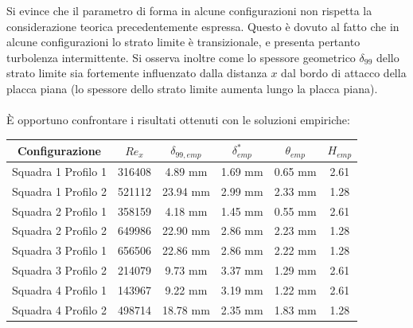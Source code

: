 \noindent Si evince che il parametro di forma in alcune configurazioni non rispetta la considerazione teorica precedentemente espressa. Questo è dovuto al fatto che in alcune configurazioni lo strato limite è transizionale, e presenta pertanto turbolenza intermittente. Si osserva inoltre come lo spessore geometrico $\delta_{99}$ dello strato limite sia fortemente influenzato dalla distanza $x$ dal bordo di attacco della placca piana (lo spessore dello strato limite aumenta lungo la placca piana).\\\\
\noindent È opportuno confrontare i risultati ottenuti con le soluzioni empiriche:
\begin{table}[H]
    \centering
    \begin{tabular}{|c|c|c|c|c|c|}
    \hline
    Configurazione             & $Re_x$ & $\delta_{99,emp}$ & $\delta^*_{emp}$ & $\theta_{emp}$ & $H_{emp}$ \\ \hline
    Squadra 1 Profilo 1 & 316408 & 4.89 mm           & 1.69 mm          & 0.65 mm        & 2.61      \\ \hline
    Squadra 1 Profilo 2 & 521112 & 23.94 mm          & 2.99 mm          & 2.33 mm        & 1.28      \\ \hline
    Squadra 2 Profilo 1 & 358159 & 4.18 mm           & 1.45 mm          & 0.55 mm        & 2.61      \\ \hline
    Squadra 2 Profilo 2 & 649986 & 22.90 mm          & 2.86 mm          & 2.23 mm        & 1.28      \\ \hline
    Squadra 3 Profilo 1 & 656506 & 22.86 mm          & 2.86 mm          & 2.22 mm        & 1.28      \\ \hline
    Squadra 3 Profilo 2 & 214079 & 9.73 mm           & 3.37 mm          & 1.29 mm        & 2.61      \\ \hline
    Squadra 4 Profilo 1 & 143967 & 9.22 mm           & 3.19 mm          & 1.22 mm        & 2.61      \\ \hline
    Squadra 4 Profilo 2 & 498714 & 18.78 mm          & 2.35 mm          & 1.83 mm        & 1.28      \\ \hline
    \end{tabular}
\end{table}

